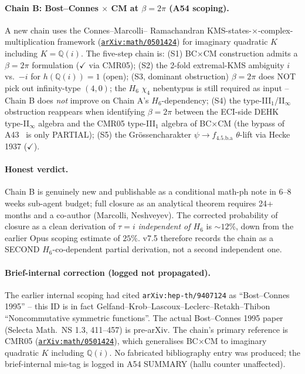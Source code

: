 \documentclass[a4paper,11pt]{article}
\newcommand{\arXiv}[1]{\href{https://arxiv.org/abs/#1}{\texttt{arXiv:#1}}}
\newcommand{\fLM}{f_{\text{4.5.b.a}}}
\newcommand{\Qi}{\mathbb{Q}(i)}
\theoremstyle{definition}
\theoremstyle{remark}
\begin{document}
\paragraph{Chain B: Bost--Connes $\times$ CM at $\beta=2\pi$
(A54 scoping).}  A new chain uses the Connes--Marcolli--%
Ramachandran KMS-states-$\times$-complex-multiplication
framework \cite{CMR05} (\arXiv{math/0501424}) for imaginary
quadratic $K$ including $K=\Qi$.  The five-step chain is:
(S1) BC$\times$CM construction admits a $\beta=2\pi$
formulation ($\checkmark$ via CMR05);
(S2) the 2-fold extremal-KMS ambiguity $i$ vs.\ $-i$ for
$h(\Qi)=1$ (open);
(S3, dominant obstruction) $\beta=2\pi$ does NOT pick out
infinity-type $(4,0)$; the $H_6$ $\chi_4$ nebentypus is still
required as input -- Chain B does \emph{not} improve on
Chain A's $H_6$-dependency;
(S4) the type-III${}_1$/II${}_\infty$ obstruction reappears
when identifying $\beta=2\pi$ between the ECI-side
DEHK~\cite{DEHK} type-II$_\infty$ algebra and the CMR05
type-III${}_1$ algebra of BC$\times$CM (the bypass of
A43~\cite{A43audit} is only PARTIAL);
(S5) the Gr\"ossencharakter $\psi\to\fLM$ $\theta$-lift via
Hecke 1937 ($\checkmark$).

\paragraph{Honest verdict.}  Chain B is genuinely new and
publishable as a conditional math-ph note in 6--8 weeks
sub-agent budget; full closure as an analytical theorem
requires 24+ months and a co-author (Marcolli, Neshveyev).
The corrected probability of closure as a clean derivation of
$\tau=i$ \emph{independent of $H_6$} is $\sim 12\%$, down from
the earlier Opus scoping estimate of $25\%$.  v7.5 therefore
records the chain as a SECOND $H_6$-co-dependent partial
derivation, not a second independent one.

\paragraph{Brief-internal correction (logged not propagated).}
The earlier internal scoping had cited
\texttt{arXiv:hep-th/9407124} as ``Bost--Connes 1995'' -- this
ID is in fact Gelfand--Krob--Lascoux--Leclerc--Retakh--Thibon
``Noncommutative symmetric functions''.  The actual
Bost--Connes 1995 paper (Selecta Math.\ NS 1.3, 411--457) is
pre-arXiv.  The chain's primary reference is CMR05
(\arXiv{math/0501424}), which generalises BC$\times$CM to
imaginary quadratic $K$ including $\Qi$.  No fabricated
bibliography entry was produced; the brief-internal mis-tag is
logged in A54 SUMMARY (hallu counter unaffected).
\end{document}
